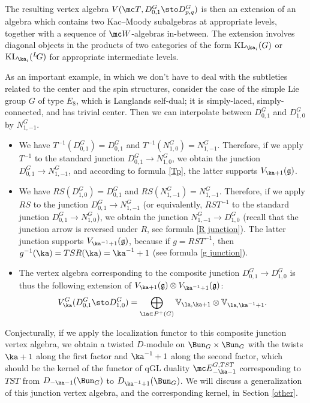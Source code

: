 \documentclass[11pt,reqno]{amsart}
\theoremstyle{plain}
\numberwithin{equation}{section}
\newcommand{\g}{\mathfrak{g}}
\def\neg{\negthinspace}
\def\LG{{}^L\neg G}
\DeclareMathOperator{\KL}{KL}
\theoremstyle{definition}
\begin{document}
The resulting vertex algebra $V({\mc T},D^G_{0,1}\sto D^G_{p,q})$ is
then an extension of an algebra which contains two Kac--Moody
subalgebras at appropriate levels, together with a sequence of ${\mc
  W}$-algebras in-between. The extension involves diagonal objects in
the products of two categories of the form $\KL_{\ka_i}(G)$ or
$\KL_{\ka_i}(\LG)$ for appropriate intermediate levels.

As an important example, in which we don't have to deal with the
subtleties related to the center and the spin structures, consider the
case of the simple Lie group $G$ of type $E_8$, which is Langlands
self-dual; it is simply-laced, simply-connected, and has trivial
center. Then we can interpolate between $D^{G}_{0,1}$ and
$D^{G}_{1,0}$ by $N^{G}_{1,-1}$.
\begin{itemize}
\item We have $T^{-1}(D^{G}_{0,1}) = D^{G}_{0,1}$ and
  $T^{-1}(N^G_{1,0}) = N^G_{1,-1}$. Therefore, if we apply $T^{-1}$ to
  the standard junction $D^{G}_{0,1} \to N^{G}_{1,0}$, we obtain the
  junction $D^{G}_{0,1} \to N^{G}_{1,-1}$, and according to
  formula \eqref{Tp}, the latter supports $V_{\ka+1}(\g)$.
\item We have $RS(D^{G}_{1,0})=D^G_{0,1}$ and $RS(N^{G}_{1,-1}) =
  N^G_{1,-1}$. Therefore, if we apply $RS$ to the junction
  $D^{G}_{0,1} \to N^{G}_{1,-1}$ (or equivalently, $RST^{-1}$ to the
  standard junction $D^{G}_{0,1} \to N^{G}_{1,0}$), we obtain the
  junction $N^{G}_{1,-1} \to D^G_{1,0}$ (recall that the junction
  arrow is reversed under $R$, see formula \eqref{R junction}). The
  latter junction supports $V_{\ka^{-1}+1}(\g)$, because if
  $g=RST^{-1}$, then $g^{-1}(\ka) = TSR(\ka) = \ka^{-1} +1$ (see
  formula \eqref{g junction}).
\item The vertex algebra corresponding to the composite junction
  $D^{G}_{0,1} \to D^G_{1,0}$ is thus the following extension of
  $V_{\ka+1}(\g) \otimes V_{\ka^{-1} +1}(\g)$:
$$
V^G_\ka(D^{G}_{0,1} \sto D^G_{1,0}) = \bigoplus_{\la \in P^+(G)}
{\mathbb V}_{\la,\ka+1} \otimes {\mathbb V}_{\la,\ka^{-1}+1}.
$$
\end{itemize}

Conjecturally, if we apply the localization functor to this composite
junction vertex algebra, we obtain a twisted $D$-module on $\Bun_G
\times \Bun_G$ with the twists $\ka+1$ along the first factor and
$\ka^{-1}+1$ along the second factor, which should be the kernel of
the functor of qGL duality ${\mc E}^{G,TST}_{-\ka-1}$ corresponding to
$TST$ from $D_{-\ka-1}(\Bun_G)$ to $D_{\ka^{-1}+1}(\Bun_G)$. We will
discuss a generalization of this junction vertex algebra, and the
corresponding kernel, in Section \ref{other}.
\end{document}
